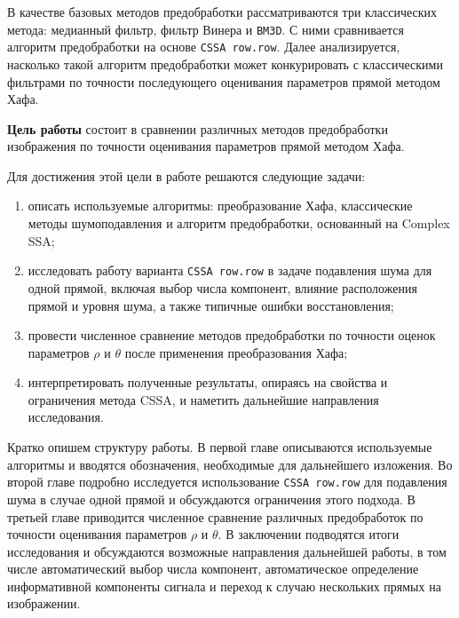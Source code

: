 В качестве базовых методов предобработки рассматриваются три классических метода: медианный фильтр, фильтр Винера и \texttt{BM3D}. С ними сравнивается алгоритм предобработки на основе \texttt{CSSA row.row}. Далее анализируется, насколько такой алгоритм предобработки может конкурировать с классическими фильтрами по точности последующего оценивания параметров прямой методом Хафа.

\textbf{Цель работы} состоит в сравнении различных методов предобработки изображения по точности оценивания параметров прямой методом Хафа.

Для достижения этой цели в работе решаются следующие задачи:
\begin{enumerate}
	\item описать используемые алгоритмы: преобразование Хафа, классические методы шумоподавления и алгоритм предобработки, основанный на Complex SSA;
	\item исследовать работу варианта \texttt{CSSA row.row} в задаче подавления шума для одной прямой, включая выбор числа компонент, влияние расположения прямой и уровня шума, а также типичные ошибки восстановления;
	\item провести численное сравнение методов предобработки по точности оценок параметров $\rho$ и $\theta$ после применения преобразования Хафа;
	\item интерпретировать полученные результаты, опираясь на свойства и ограничения метода CSSA, и наметить дальнейшие направления исследования.
\end{enumerate}

Кратко опишем структуру работы. В первой главе описываются используемые алгоритмы и вводятся обозначения, необходимые для дальнейшего изложения. Во второй главе подробно исследуется использование \texttt{CSSA row.row} для подавления шума в случае одной прямой и обсуждаются ограничения этого подхода. В третьей главе приводится численное сравнение различных предобработок по точности оценивания параметров $\rho$ и $\theta$. В заключении подводятся итоги исследования и обсуждаются возможные направления дальнейшей работы, в том числе автоматический выбор числа компонент, автоматическое определение информативной компоненты сигнала и переход к случаю нескольких прямых на изображении.
